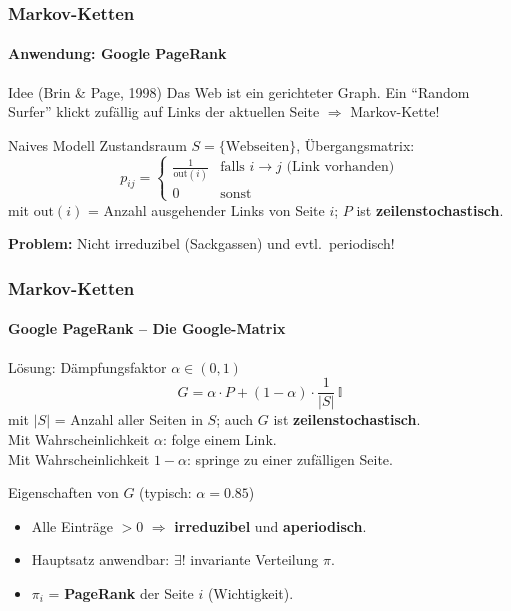 \documentclass{beamer}
\begin{document}

\begin{frame}
    \frametitle{Markov-Ketten}
\framesubtitle{Anwendung: Google PageRank}
    \begin{block}{Idee (Brin \& Page, 1998)}
Das Web ist ein gerichteter Graph. Ein ``Random Surfer'' klickt zufällig auf Links der aktuellen Seite $\Rightarrow$ Markov-Kette!
\end{block}
\begin{block}{Naives Modell}
Zustandsraum $S = \{\text{Webseiten}\}$, Übergangsmatrix:
\[
p_{ij} = \begin{cases} \frac{1}{\text{out}(i)} & \text{falls } i \to j \text{ (Link vorhanden)} \\ 0 & \text{sonst} \end{cases}
\]
mit $\text{out}(i)$ = Anzahl ausgehender Links von Seite $i$; $P$ ist \textbf{zeilenstochastisch}.
\end{block}
\textbf{Problem:} Nicht irreduzibel (Sackgassen) und evtl.\ periodisch!
 \end{frame}



\begin{frame}
    \frametitle{Markov-Ketten}
\framesubtitle{Google PageRank -- Die Google-Matrix}
    \begin{block}{Lösung: Dämpfungsfaktor $\alpha \in (0,1)$}
\[
G = \alpha \cdot P + (1 - \alpha) \cdot \frac{1}{|S|} \, \mathbb{I}
\]
mit $|S|$ = Anzahl aller Seiten in $S$; auch $G$ ist \textbf{zeilenstochastisch}.\\
Mit Wahrscheinlichkeit $\alpha$: folge einem Link.\\
Mit Wahrscheinlichkeit $1-\alpha$: springe zu einer zufälligen Seite.
\end{block}
\begin{block}{Eigenschaften von $G$ (typisch: $\alpha = 0.85$)}
\begin{itemize}
\item Alle Einträge $> 0$ $\Rightarrow$ \textbf{irreduzibel} und \textbf{aperiodisch}.
\item Hauptsatz anwendbar: $\exists!$ invariante Verteilung $\pi$.
\item $\pi_i$ = \textbf{PageRank} der Seite $i$ (Wichtigkeit).
\end{itemize}
\end{block}
 \end{frame}
\end{document}
